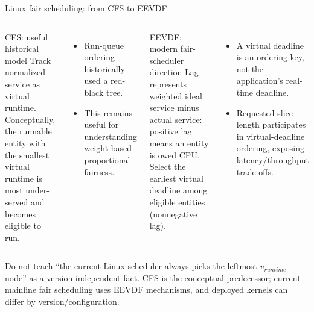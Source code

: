 \documentclass[aspectratio=169,11pt]{beamer}
\begin{document}
\begin{frame}{Linux fair scheduling: from CFS to EEVDF}
  \scriptsize
  \begin{columns}[T,onlytextwidth]
      \begin{block}{CFS: useful historical model}
        Track normalized service as virtual runtime. Conceptually, the runnable entity with the smallest virtual runtime is most under-served and becomes eligible to run.
      \end{block}
      \begin{itemize}
        \item Run-queue ordering historically used a red-black tree.
        \item This remains useful for understanding weight-based proportional fairness.
      \end{itemize}
      \begin{block}{EEVDF: modern fair-scheduler direction}
        Lag represents weighted ideal service minus actual service: positive lag means an entity is owed CPU. Select the earliest virtual deadline among eligible entities (nonnegative lag).
      \end{block}
      \begin{itemize}
        \item A virtual deadline is an ordering key, not the application's real-time deadline.
        \item Requested slice length participates in virtual-deadline ordering, exposing latency/throughput trade-offs.
      \end{itemize}
  \end{columns}
  \begin{tcolorbox}[title=Interpretation,colback=orange!5,colframe=orange!70]
    Do not teach “the current Linux scheduler always picks the leftmost $v_{runtime}$ node” as a version-independent fact. CFS is the conceptual predecessor; current mainline fair scheduling uses EEVDF mechanisms, and deployed kernels can differ by version/configuration.
  \end{tcolorbox}
\end{frame}
\end{document}
